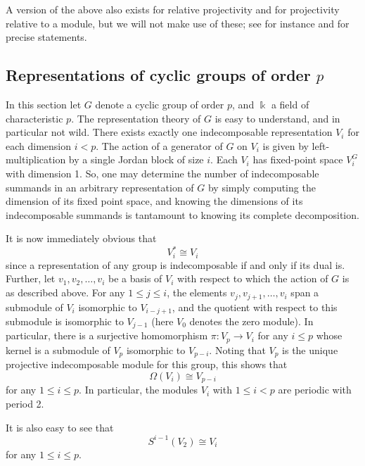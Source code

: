 \documentclass[a4paper]{amsart}
\newcommand{\kk}{\Bbbk}
\theoremstyle{definition}
\theoremstyle{remark}
\theoremstyle{Acknowledgments}
\begin{document}
A version of the above also exists for relative projectivity and for projectivity relative to a module, but we will not make use of these; see for instance \cite{ElmerRelCoh} and \cite{Lassueur} for precise statements.

\subsection{Representations of cyclic groups of order $p$}

In this section let $G$ denote a cyclic group of order $p$, and $\kk$ a field of characteristic $p$. The representation theory of $G$ is easy to understand, and in particular not wild. There exists exactly one indecomposable representation $V_i$ for each dimension $i<p$. The action of a generator of $G$ on $V_i$ is given by left-multiplication by a single Jordan block of size $i$. Each $V_i$ has fixed-point space $V_i^G$ with dimension 1. So, one may determine the number of indecomposable summands in an arbitrary representation of $G$ by simply computing the dimension of its fixed point space, and knowing the dimensions of its indecomposable summands is tantamount to knowing its complete decomposition.

It is now immediately obvious that
\begin{equation}\label{dual} V_i^* \cong V_i
\end{equation}
since a representation of any group is indecomposable if and only if its dual is. Further, let $v_1, v_2, \ldots, v_i$ be a basis of $V_i$ with respect to which the action of $G$ is as described above. For any $1 \leq j \leq i$, the elements $v_j, v_{j+1}, \ldots, v_i$ span a submodule of $V_i$ isomorphic to $V_{i-j+1}$, and the quotient with respect to this submodule is isomorphic to $V_{j-1}$ (here $V_0$ denotes the zero module).  In particular, there is a surjective homomorphism $\pi: V_p \rightarrow V_i$ for any $i \leq p$ whose kernel is a submodule of $V_p$ isomorphic to $V_{p-i}$.  Noting that $V_p$ is the unique projective indecomposable module for this group,   this shows that
 \begin{equation}\label{heller} \Omega(V_i) \cong V_{p-i}
\end{equation}
for any $1 \leq i \leq p$. In particular, the modules $V_i$ with $1 \leq i<p$ are periodic with period 2.

It is also easy to see that
\begin{equation}\label{symV} S^{i-1}(V_2) \cong V_i
\end{equation}
 for any $1 \leq i \leq p$.
\end{document}
